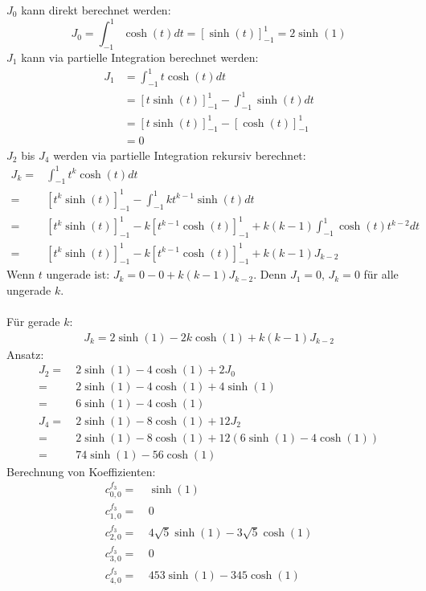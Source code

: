 $J_0$ kann direkt berechnet werden:
\begin{equation}
	J_0 = \int_{-1}^{1} \cosh (t)dt = \left[\sinh(t)\right]^1_{-1} = 2\sinh(1)
\end{equation}
$J_1$ kann via partielle Integration berechnet werden:
\begin{align}
	J_1 & = \int_{-1}^{1} t \cosh(t) dt \\
	 	& = \left[t\sinh(t)\right]^{1}_{-1} - \int_{-1}^{1} \sinh(t) dt \\
	 	& = \left[t\sinh(t)\right]^{1}_{-1} - \left[\cosh(t)\right]^{1}_{-1} \\
	 	& = 0
\end{align}
$J_2$ bis $J_4$ werden via partielle Integration rekursiv berechnet: 
\begin{align}
	J_k = & \int_{-1}^{1} t^k \cosh(t) dt \\
		= & \left[t^k\sinh(t)\right]_{-1}^{1} - \int_{-1}^{1}k t^{k-1} \sinh(t) dt \\
		= & \left[t^k\sinh(t)\right]_{-1}^{1} - k\left[t^{k-1}\cosh(t)\right]_{-1}^{1} + k(k-1)\int_{-1}^{1} \cosh(t)t^{k-2}dt \\
		= & \left[t^k\sinh(t)\right]_{-1}^{1} - k\left[t^{k-1}\cosh(t)\right]_{-1}^{1} + k(k-1)J_{k-2}
\end{align}
Wenn $t$ ungerade ist: $J_k = 0-0+k(k-1)J_{k-2}$. Denn $J_1 = 0$, $J_k = 0$ für alle ungerade $k$. \\\\
Für gerade $k$:
\begin{align}
	J_k = 2\sinh(1) - 2k\cosh(1) + k(k-1)J_{k-2} 
\end{align}
Ansatz:
\begin{align}
	J_2 = \ & 2\sinh(1) - 4\cosh(1) + 2J_0 \\
	= \ & 2\sinh(1) - 4\cosh(1) + 4 \sinh(1) \\
	= \ & 6\sinh(1) - 4\cosh(1) \\
	J_4 = \ & 2\sinh(1) - 8\cosh(1) + 12 J_2\\
		= \ & 2\sinh(1) - 8\cosh(1) + 12 (6\sinh(1) - 4\cosh(1))\\
		= \ & 74 \sinh(1) - 56\cosh(1)
\end{align}
Berechnung von Koeffizienten:
\begin{align}
	c_{0,0}^{f_3} = \ & \sinh(1) \\
	c_{1,0}^{f_3} = \ & 0 \\
	c_{2,0}^{f_3} = \ & 4\sqrt{5}\sinh(1) - 3\sqrt{5} \cosh(1) \\
	c_{3,0}^{f_3} = \ & 0 \\
	c_{4,0}^{f_3} = \ & 453\sinh(1) - 345\cosh(1)
\end{align}

